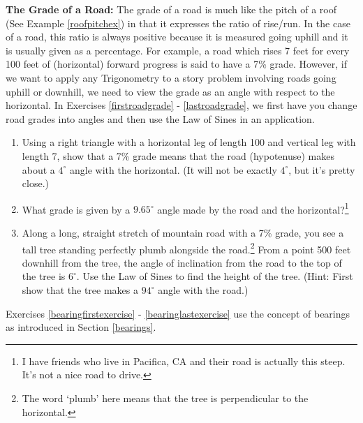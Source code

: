 \documentclass{ximera}
\begin{document}
\label{gradeofroad}
\textbf{The Grade of a Road:} The grade of a road is much like the pitch of a roof (See Example \ref{roofpitchex}) in that it expresses the ratio of rise/run.  In the case of a road, this ratio is always positive because it is measured going uphill and it is usually given as a percentage.  For example, a road which rises 7 feet for every 100 feet of (horizontal) forward progress is said to have a 7\% grade.  However, if we want to apply any Trigonometry to a story problem involving roads going uphill or downhill, we need to view the grade as an angle with respect to the horizontal.  In Exercises \ref{firstroadgrade} - \ref{lastroadgrade}, we first have you change road grades into angles and then use the Law of Sines in an application.

\begin{enumerate}

\setcounter{enumi}{\value{HW}}

\item Using a right triangle with a horizontal leg of length 100 and vertical leg with length 7, show that a 7\% grade means that the road (hypotenuse) makes about a $4^{\circ}$ angle with the horizontal.  (It will not be exactly $4^{\circ}$, but it's pretty close.) \label{firstroadgrade}

\item What grade is given by a $9.65^{\circ}$ angle made by the road and the horizontal?\footnote{I have friends who live in Pacifica, CA and their road is actually this steep.  It's not a nice road to drive.}

\item Along a long, straight stretch of mountain road with a 7\% grade, you see a tall tree standing perfectly plumb alongside the road.\footnote{The word `plumb' here means that the tree is perpendicular to the horizontal.}  From a point 500 feet downhill from the tree, the angle of inclination from the road to the top of the tree is $6^{\circ}$.  Use the Law of Sines to find the height of the tree.  (Hint: First show that the tree makes a $94^{\circ}$ angle with the road.) \label{lastroadgrade}

\setcounter{HW}{\value{enumi}}

\end{enumerate}

Exercises \ref{bearingfirstexercise} - \ref{bearinglastexercise} use the concept of bearings as introduced in Section \ref{bearings}.
\end{document}
